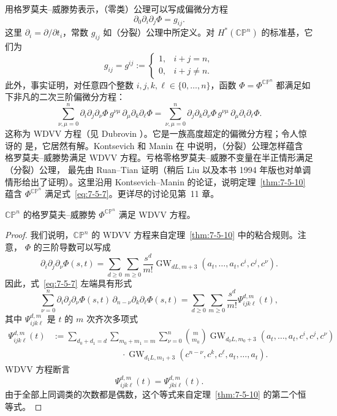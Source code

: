 用格罗莫夫--威滕势表示，（零类）公理可以写成偏微分方程
\begin{equation}\label{eq:7-5-6}
  \partial_0\partial_i\partial_j\Phi=g_{ij}.
\end{equation}
这里 $\partial_i=\partial/\partial t_i$，常数 $g_{ij}$ 如（分裂）公理中所定义。对
$H^*(\mathbb{CP}^n)$ 的标准基，它们为
\[
  g_{ij}=g^{ij}:=
  \begin{cases}
    1,&i+j=n,\\
    0,&i+j\ne n.
  \end{cases}
\]
此外，事实证明，对任意四个整数
$i,j,k,\ell\in\{0,\ldots,n\}$，函数
$\Phi=\Phi^{\mathbb{CP}^n}$ 都满足如下非凡的二次三阶偏微分方程：
\begin{equation}\label{eq:7-5-7}
  \sum_{\nu,\mu=0}^n
  \partial_i\partial_j\partial_\nu\Phi\,g^{\nu\mu}\,
  \partial_\mu\partial_k\partial_\ell\Phi
  =\sum_{\nu,\mu=0}^n
  \partial_j\partial_k\partial_\nu\Phi\,g^{\nu\mu}\,
  \partial_\mu\partial_i\partial_\ell\Phi.
\end{equation}
这称为 WDVV 方程（见 Dubrovin ）。它是一族高度超定的偏微分方程；令人惊讶的
是，它居然有解。Kontsevich 和 Manin 在  中说明，（分裂）公理怎样蕴含
格罗莫夫--威滕势满足 WDVV 方程。亏格零格罗莫夫--威滕不变量在半正情形满足（分裂）公理，
最先由 Ruan--Tian  证明（稍后 Liu  以及本书 1994 年版也对单调
情形给出了证明）。这里沿用 Kontsevich--Manin 的论证，说明定理~\ref{thm:7-5-10} 蕴含
$\Phi^{\mathbb{CP}^n}$ 满足式~\eqref{eq:7-5-7}。更详尽的讨论见第~11 章。

\begin{proposition}\label{prop:7-5-14}
$\mathbb{CP}^n$ 的格罗莫夫--威滕势 $\Phi^{\mathbb{CP}^n}$ 满足 WDVV 方程。
\end{proposition}

\begin{proof}
我们说明，$\mathbb{CP}^n$ 的 WDVV 方程来自定理~\ref{thm:7-5-10} 中的粘合规则。注意，
$\Phi$ 的三阶导数可以写成
\[
  \partial_i\partial_j\partial_\nu\Phi(s,t)
  =\sum_{d\ge0}\sum_{m\ge0}\frac{s^d}{m!}
    \operatorname{GW}_{dL,m+3}
    (a_t,\ldots,a_t,c^i,c^j,c^\nu).
\]
因此，式~\eqref{eq:7-5-7} 左端具有形式
\[
  \sum_{\nu=0}^n
  \partial_i\partial_j\partial_\nu\Phi(s,t)\,
  \partial_{n-\nu}\partial_k\partial_\ell\Phi(s,t)
  =\sum_{d\ge0}\sum_{m\ge0}\frac{s^d}{m!}
    \Psi_{ijk\ell}^{d,m}(t),
\]
其中 $\Psi_{ijk\ell}^{d,m}$ 是 $t$ 的 $m$ 次齐次多项式
\begin{align*}
  \Psi_{ijk\ell}^{d,m}(t)
  &:={}
  \sum_{d_0+d_1=d}\sum_{m_0+m_1=m}\sum_{\nu=0}^n
  \binom{m}{m_0}
  \operatorname{GW}_{d_0L,m_0+3}
    (a_t,\ldots,a_t,c^i,c^j,c^\nu)\\
  &\hspace{8em}\cdot
  \operatorname{GW}_{d_1L,m_1+3}
    (c^{n-\nu},c^k,c^\ell,a_t,\ldots,a_t).
\end{align*}
WDVV 方程断言
\[
  \Psi_{ijk\ell}^{d,m}(t)=\Psi_{jki\ell}^{d,m}(t).
\]
由于全部上同调类的次数都是偶数，这个等式来自定理~\ref{thm:7-5-10} 的第二个恒等式。
\end{proof}

